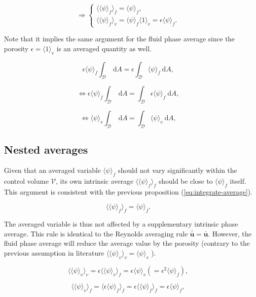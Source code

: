 \documentclass[a4paper,11pt]{article}
\begin{document}
$$\Rightarrow
\begin{cases}
    \langle\langle\psi\rangle_f\rangle_f=\langle\psi\rangle_f,\\
    \langle\langle\psi\rangle_f\rangle_v=\langle\psi\rangle_f\langle1\rangle_v=\epsilon\langle\psi\rangle_f.
\end{cases}$$

Note that it implies the same argument for the fluid phase average since the porosity $\epsilon=\langle1\rangle_v$ is an averaged quantity as well.

$$\epsilon\langle\psi\rangle_f\int_{\mathcal D}~\mathrm dA=\epsilon\int_{\mathcal D}\langle\psi\rangle_f~\mathrm dA,$$

$$\Leftrightarrow\epsilon\langle\psi\rangle_f\int_{\mathcal D}~\mathrm dA=\int_{\mathcal D}\epsilon\langle\psi\rangle_f~\mathrm dA,$$

$$\Leftrightarrow\langle\psi\rangle_v\int_{\mathcal D}~\mathrm dA=\int_{\mathcal D}\langle\psi\rangle_v~\mathrm dA,$$

\subsection{Nested averages}

Given that an averaged variable $\langle\psi\rangle_f$ should not vary significantly within the control volume $\mathcal V$, its own intrinsic average $\langle\langle\psi\rangle_f\rangle_f$ should be close to $\langle\psi\rangle_f$ itself.
This argument is consistent with the previous proposition (\autoref{eq:integrate-average}).

$$\langle\langle\psi\rangle_f\rangle_f=\langle\psi\rangle_f.$$

The averaged variable is thus not affected by a supplementary intrinsic phase average.
This rule is identical to the Reynolds averaging rule ${\bm{\overline{\bar u}}=\bm{\bar u}}$.
However, the fluid phase average will reduce the average value by the porosity (contrary to the previous assumption in literature ${\langle\langle\psi\rangle_v\rangle_v=\langle\psi\rangle_v}$ \citep{Gray1974}).

$$\langle\langle\psi\rangle_v\rangle_v = \epsilon\langle\langle\psi\rangle_v\rangle_f = \epsilon\langle\psi\rangle_v\left(=\epsilon^2\langle\psi\rangle_f\right),$$

$$\langle\langle\psi\rangle_v\rangle_f = \langle\epsilon\langle\psi\rangle_f\rangle_f = \epsilon\langle\langle\psi\rangle_f\rangle_f = \epsilon\langle\psi\rangle_f,$$
\end{document}
